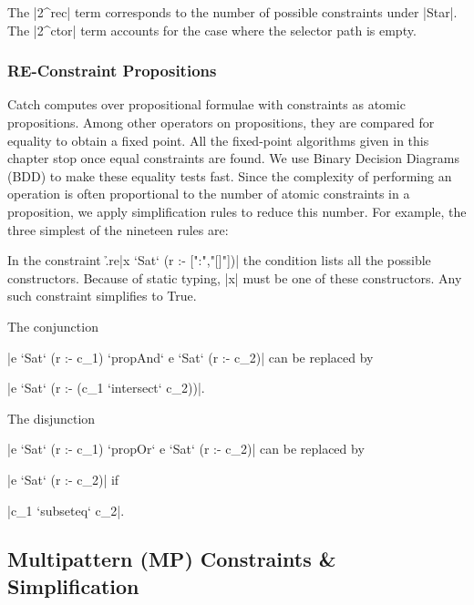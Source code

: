 The |2^rec| term corresponds to the number of possible constraints under |Star|. The |2^ctor| term accounts for the case where the selector path is empty.


\subsubsection{RE-Constraint Propositions}
\label{secC:re-propositions}

Catch computes over propositional formulae with constraints as atomic propositions. Among other operators on propositions, they are compared for equality to obtain a fixed point. All the fixed-point algorithms given in this chapter stop once equal constraints are found. We use Binary Decision Diagrams (BDD) \cite{lee:bdd} to make these equality tests fast. Since the complexity of performing an operation is often proportional to the number of atomic constraints in a proposition, we apply simplification rules to reduce this number. For example, the three  simplest of the nineteen rules are:

 In the constraint \h{.re}|x `Sat` (r :- [":","[]"])| the condition lists all the possible constructors. Because of static typing, |x| must be one of these constructors. Any such constraint simplifies to True.

 The conjunction \ignore|e `Sat` (r :- c_1) `propAnd` e `Sat` (r :- c_2)| can be replaced by \ignore|e `Sat` (r :- (c_1 `intersect` c_2))|.

 The disjunction \ignore|e `Sat` (r :- c_1) `propOr` e `Sat` (r :- c_2)| can be replaced by \ignore|e `Sat` (r :- c_2)| if \ignore|c_1 `subseteq` c_2|.


\subsection{Multipattern (MP) Constraints \& Simplification}
\label{secC:multipattern}


